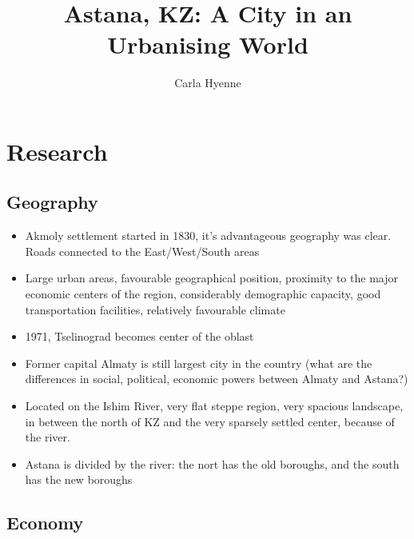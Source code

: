 \documentclass[11pt]{article}
\title{Astana, KZ: A City in an Urbanising World}
\author{Carla Hyenne}
\date{}
\begin{document}
\maketitle 

\tableofcontents %


\section{Research}

\subsection{Geography}

\begin{itemize}
  \item Akmoly settlement started in 1830, it's advantageous geography was clear. Roads connected to the East/West/South areas
  \item Large urban areas, favourable geographical position, proximity to the major economic centers of the region, considerably demographic capacity, good transportation facilities, relatively favourable climate
  \item 1971, Tselinograd becomes center of the oblast
  \item Former capital Almaty is still largest city in the country (what are the differences in social, political, economic powers between Almaty and Astana?)
  \item Located on the Ishim River, very flat steppe region, very spacious landscape, in between the north of KZ and the very sparsely settled center, because of the river. 
  \item Astana is divided by the river: the nort has the old boroughs, and the south has the new boroughs
\end{itemize}

\subsection{Economy}
\end{document}
